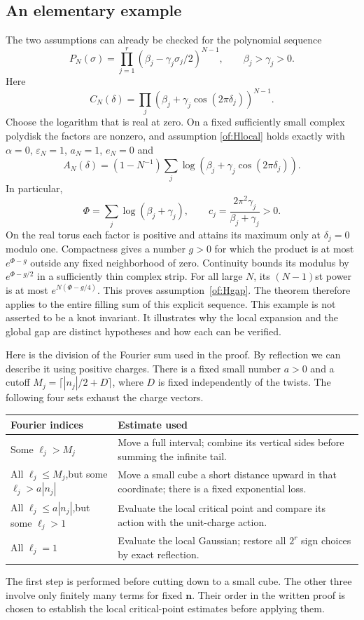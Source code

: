 \documentclass[11pt]{article}
\numberwithin{equation}{section}
\theoremstyle{definition}\newtheorem{definition}[theorem]{Definition}
\theoremstyle{remark}\newtheorem{remark}[theorem]{Remark}
\begin{document}
\subsection{An elementary example}

The two assumptions can already be checked for the polynomial sequence
\[
 P_N(\sigma)=\prod_{j=1}^r
                   (\beta_j-\gamma_j\sigma_j/2)^{N-1},
                  \qquad \beta_j>\gamma_j>0 .
\]
Here
\[
 C_N(\delta)=
   \prod_j(\beta_j+\gamma_j\cos(2\pi\delta_j))^{N-1}.
\]
Choose the logarithm that is real at zero. On a fixed sufficiently
small complex polydisk the factors are nonzero, and assumption
\ref{of:Hlocal} holds exactly with $\alpha=0$, $\varepsilon_N=1$,
$a_N=1$, $e_N=0$ and
\[
 A_N(\delta)=(1-N^{-1})
            \sum_j\log(\beta_j+\gamma_j\cos(2\pi\delta_j)).
\]
In particular,
\[
 \Phi=\sum_j\log(\beta_j+\gamma_j),\qquad
 c_j=\frac{2\pi^2\gamma_j}{\beta_j+\gamma_j}>0 .
\]
On the real torus each factor is positive and attains its maximum
only at $\delta_j=0$ modulo one. Compactness gives a number $g>0$
for which the product is at most $e^{\Phi-g}$ outside any fixed
neighborhood of zero. Continuity bounds its modulus by
$e^{\Phi-g/2}$ in a sufficiently thin complex strip. For all large
$N$, its $(N-1)$st power is at most $e^{N(\Phi-g/4)}$.
This proves assumption~\ref{of:Hgap}. The theorem therefore applies to the
entire filling sum of this explicit sequence. This example is not
asserted to be a knot invariant. It illustrates why the local
expansion and the global gap are distinct hypotheses and how each
can be verified.

Here is the division of the Fourier sum used in the proof. By reflection
we can describe it using positive charges. There is a fixed small
number $a>0$ and a cutoff
$M_j=\lceil |n_j|/2+D\rceil$, where $D$ is fixed independently
of the twists. The following four sets exhaust the charge vectors.
\begin{center}
\begin{tabular}{@{}p{.45\linewidth}p{.48\linewidth}@{}}
\toprule
Fourier indices & Estimate used \\
\midrule
Some $\ell_j>M_j$ & Move a full interval; combine its vertical sides
before summing the infinite tail. \\[2pt]
All $\ell_j\le M_j$,\newline but some $\ell_j>a|n_j|$ & Move a small cube a
short distance upward in that coordinate; there is a fixed exponential
loss. \\[2pt]
All $\ell_j\le a|n_j|$,\newline but some $\ell_j>1$ & Evaluate the local
critical point and compare its action with the unit-charge action. \\[2pt]
All $\ell_j=1$ & Evaluate the local Gaussian; restore all $2^r$ sign
choices by exact reflection. \\
\bottomrule
\end{tabular}
\end{center}
The first step is performed before cutting down to a small cube. The
other three involve only finitely many terms for fixed
$\boldsymbol n$. Their order in the written proof is chosen to
establish the local critical-point estimates before applying them.
\end{document}
